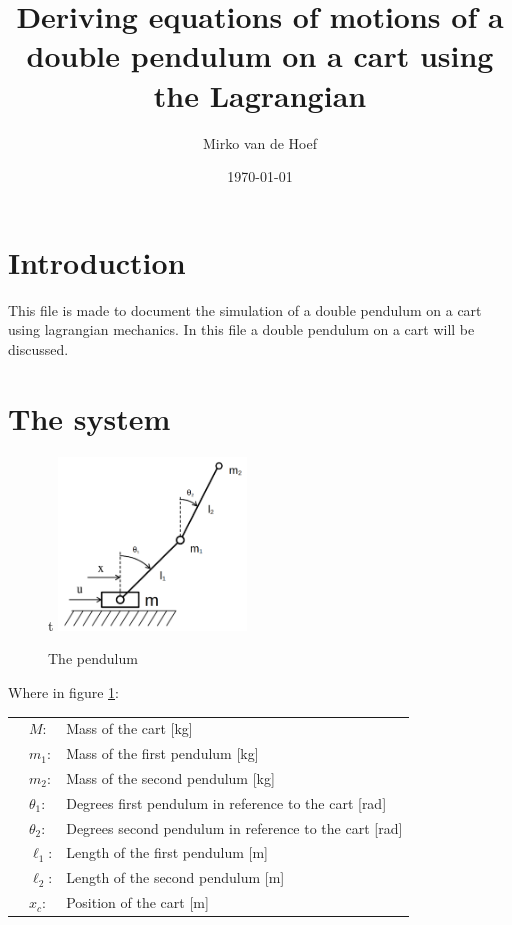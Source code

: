 \documentclass[10pt]{article}
\author{Mirko van de Hoef}
\title{Deriving equations of motions of a double pendulum on a cart using the Lagrangian}
\date{\today}
\begin{document}
    \maketitle

    \section{Introduction}
    This file is made to document the simulation of a double pendulum on a cart using lagrangian mechanics. 
    In this file a double pendulum on a cart will be discussed.

    \section{The system}
    \begin{figure}{t}
        \centering
        \includegraphics[width=5cm]{post-aRippol-02-pendulum_notations.png}
        \caption{The pendulum}
        \label{fig:system}
    \end{figure}
    
    Where in figure \ref{fig:system}: \\
    \begin{tabular}{@{}l l l@{}}
        & $M$: & Mass of the cart  [kg] \\
        & $m_1$: & Mass of the first pendulum  [kg] \\
        & $m_2$: & Mass of the second pendulum  [kg] \\
        & $\theta_1$: & Degrees first pendulum in reference to the cart [rad] \\
        & $\theta_2$: & Degrees second pendulum in reference to the cart [rad] \\
        & $\ell_1$: & Length of the first pendulum [m] \\
        & $\ell_2$: & Length of the second pendulum [m] \\
        & $x_c$: & Position of the cart [m] \\
    \end{tabular}
    
\end{document}
